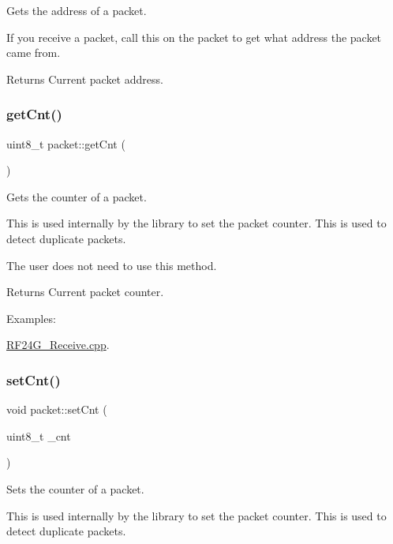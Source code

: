 Gets the address of a packet.

If you receive a packet, call this on the packet to get what address the packet came from.

\begin{DoxyReturn}{Returns}
Current packet address. 
\end{DoxyReturn}
\hypertarget{classpacket_a232661ed34d4278ab9bc81593a1aac64}{}\label{classpacket_a232661ed34d4278ab9bc81593a1aac64} 
\subsubsection{\texorpdfstring{get\+Cnt()}{getCnt()}}
{\footnotesize\ttfamily uint8\+\_\+t packet\+::get\+Cnt (\begin{DoxyParamCaption}{ }\end{DoxyParamCaption})}

Gets the counter of a packet.

This is used internally by the library to set the packet counter. This is used to detect duplicate packets.

The user does not need to use this method.

\begin{DoxyReturn}{Returns}
Current packet counter. 
\end{DoxyReturn}
\begin{Desc}
\item[Examples\+: ]\par
\hyperlink{_r_f24_g__receive_8cpp-example}{R\+F24\+G\+\_\+\+Receive.\+cpp}.\end{Desc}
\hypertarget{classpacket_a583358f8d3e3361ba62af95ecd0308c2}{}\label{classpacket_a583358f8d3e3361ba62af95ecd0308c2} 
\subsubsection{\texorpdfstring{set\+Cnt()}{setCnt()}}
{\footnotesize\ttfamily void packet\+::set\+Cnt (\begin{DoxyParamCaption}\item[{uint8\+\_\+t}]{\+\_\+cnt }\end{DoxyParamCaption})}

Sets the counter of a packet.

This is used internally by the library to set the packet counter. This is used to detect duplicate packets.

